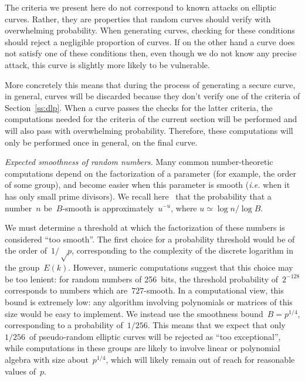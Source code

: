 \documentclass[twocolumn,letterpaper,10pt]{article}
\begin{document}
The criteria we present here do not correspond to
known attacks on elliptic curves.
Rather, they are properties that random curves should verify
with overwhelming probability.
When generating curves, checking for these conditions
should reject a negligible proportion of curves.
If on the other hand a curve does not satisfy one of these conditions
then, even though we do not know any precise attack,
this curve is slightly more likely to be vulnerable.

More concretely this means that during the process of generating
a secure curve, in general, curves will be discarded
because they don't verify one of the criteria of Section~\ref{ss:dlp}.
When a curve passes the checks for the latter criteria,
the computations needed for the criteria of the current section
will be performed and will also pass with overwhelming probability.
Therefore, these computations will only be performed once in general,
on the final curve.
\medbreak\par\textit{Expected smoothness of random numbers.} %
Many common number-theoretic computations depend on
the factorization of a parameter (for example, the order of some group),
and become easier when this parameter is smooth
(\emph{i.e.} when it has only small prime divisors).
We recall here~\cite{jnt1983cep} that the probability that
a number~$n$ be~$B$-smooth is approximately~$u^{-u}$,
where $u ≃ \log n / \log B$.

We must determine a threshold at which the factorization of these
numbers is considered ``too smooth''.
The first choice for a probability threshold would be
of the order of~$1/√p$, corresponding to the complexity of
the discrete logarithm in the group~$E(k)$.
However, numeric computations suggest that this choice may be too lenient:
for random numbers of 256~bits, the threshold probability of~$2^{-128}$
corresponds to numbers which are~$727$-smooth.
In a computational view, this bound is extremely low:
any algorithm involving polynomials or matrices of this size
would be easy to implement.
We instead use the smoothness bound~$B = p^{1/4}$,
corresponding to a probability of~$1/256$.
This means that we expect that only
$1/256$~of pseudo-random elliptic curves
will be rejected as ``too exceptional'',
while computations in these groups
are likely to involve linear or polynomial algebra
with size about~$p^{1/4}$,
which will likely remain out of reach for reasonable values of~$p$.
\end{document}
